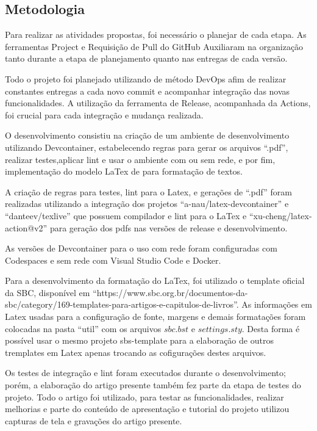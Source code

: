 \subsection{Metodologia}

Para realizar as atividades propostas, foi necessário o planejar de cada etapa. As ferramentas Project e Requisição de Pull do GitHub Auxiliaram na organização tanto durante a etapa de planejamento quanto nas entregas de cada versão.

Todo o projeto foi planejado utilizando de método DevOps afim de realizar constantes entregas a cada novo commit e acompanhar integração das novas funcionalidades. A utilização da ferramenta de Release, acompanhada da Actions, foi crucial para cada integração e mudança realizada.

O desenvolvimento consistiu na criação de um ambiente de desenvolvimento utilizando Devcontainer, estabelecendo regras para gerar os arquivos ``.pdf'', realizar testes,aplicar lint e usar o ambiente com ou sem rede, e por fim, implementação do modelo LaTex de para formatação de textos.


A criação de regras para testes, lint para o Latex, e gerações de ``.pdf'' foram realizadas utilizando a integração dos projetos ``a-nau/latex-devcontainer'' e ``danteev/texlive'' que possuem compilador e lint para o LaTex e ``xu-cheng/latex-action@v2'' para geração dos pdfs nas versões de release e desenvolvimento.

As versões de Devcontainer para o uso com rede foram configuradas com Codespaces e sem rede com Visual Studio Code e Docker.

Para a desenvolvimento da formatação do LaTex, foi utilizado o template oficial da SBC, disponível em ``https://www.sbc.org.br/documentos-da-sbc/category/169-templates-para-artigos-e-capitulos-de-livros''. As informações em Latex usadas para a configuração de fonte, margens e demais formatações foram colocadas na pasta ``util'' com os arquivos $sbc.bst$ e $settings.sty$. Desta forma é possível usar o mesmo projeto sbs-template para a elaboração de outros tremplates em Latex apenas trocando as cofigurações destes arquivos.

Os testes de integração e lint foram executados durante o desenvolvimento; porém, a elaboração do artigo presente também fez parte da etapa de testes do projeto. Todo o artigo foi utilizado, para testar as funcionalidades, realizar melhorias e parte do conteúdo de apresentação e tutorial do projeto utilizou capturas de tela e gravações do artigo presente.